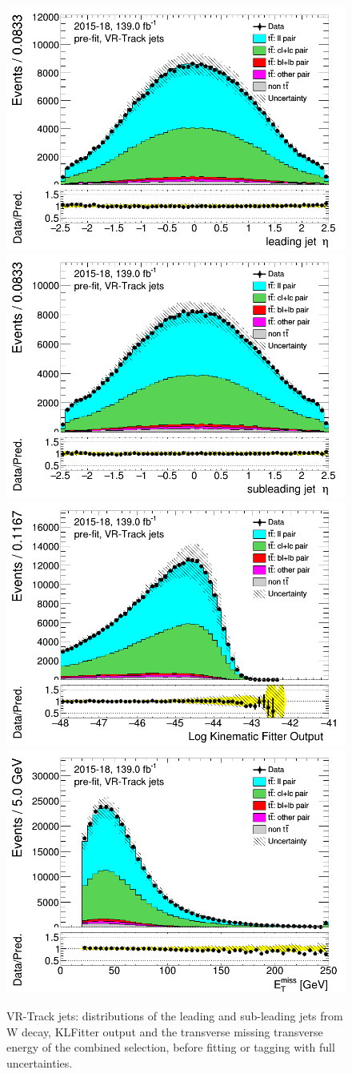 \documentclass[letterpaper,12pt]{article}
\begin{document}
	
	
	\newpage	
	\begin{figure}[H]
	\includegraphics[width=.45\textwidth]{FTAG_plots/pretagNoRwwithhighpTVRJetsall/DataMC_h_J0_etatrackjet.png}
	\includegraphics[width=.45\textwidth]{FTAG_plots/pretagNoRwwithhighpTVRJetsall/DataMC_h_J1_etatrackjet.png}\\
	\includegraphics[width=.45\textwidth]{FTAG_plots/pretagNoRwwithhighpTVRJetsall/DataMC_h_LLRtrackjet.png}
	\includegraphics[width=.45\textwidth]{FTAG_plots/pretagNoRwwithhighpTVRJetsall/DataMC_h_METtrackjet.png}\\
	
	\caption{VR-Track jets: distributions of the leading and sub-leading jets 
	from W decay, KLFitter output and the transverse missing transverse 
	energy of the combined selection, before fitting or tagging with 
	full uncertainties.} \label{fig:combined_jets_VRJets}
	\end{figure}
	
\end{document}
